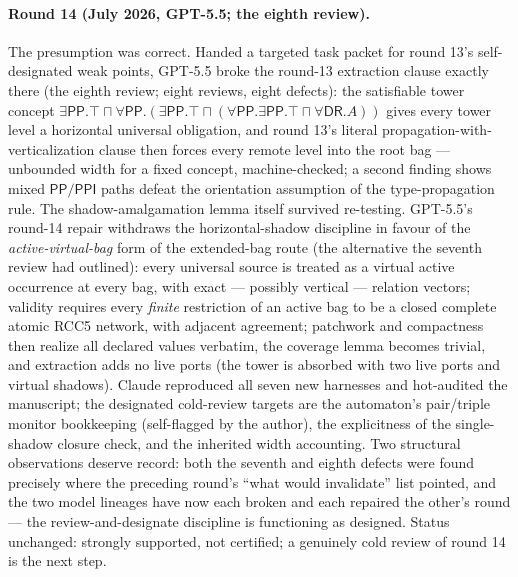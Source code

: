 \documentclass[
]{ceurart}
\theoremstyle{definition}
\newcommand{\DR}{\ensuremath{\mathsf{DR}}}
\newcommand{\PP}{\ensuremath{\mathsf{PP}}}
\newcommand{\PPI}{\ensuremath{\mathsf{PPI}}}
\begin{document}
\paragraph{Round 14 (July 2026, GPT-5.5; the eighth review).}
The presumption was correct.  Handed a targeted task packet for round 13's
self-designated weak points, GPT-5.5 broke the round-13 extraction clause
exactly there (the eighth review; eight reviews, eight defects): the
satisfiable tower concept
$\exists\PP.\top\sqcap\forall\PP.(\exists\PP.\top\sqcap(\forall\PP.\exists\PP.\top
\sqcap\forall\DR.A))$ gives every tower level a horizontal universal
obligation, and round 13's literal propagation-with-verticalization clause
then forces every remote level into the root bag --- unbounded width for a
fixed concept, machine-checked; a second finding shows mixed
$\PP/\PPI$ paths defeat the orientation assumption of the type-propagation
rule.  The shadow-amalgamation lemma itself survived re-testing.  GPT-5.5's
round-14 repair withdraws the horizontal-shadow discipline in favour of the
\emph{active-virtual-bag} form of the extended-bag route (the alternative
the seventh review had outlined): every universal source is treated as a
virtual active occurrence at every bag, with exact --- possibly vertical ---
relation vectors; validity requires every \emph{finite} restriction of an
active bag to be a closed complete atomic RCC5 network, with adjacent
agreement; patchwork and compactness then realize all declared values
verbatim, the coverage lemma becomes trivial, and extraction adds no live
ports (the tower is absorbed with two live ports and virtual shadows).
Claude reproduced all seven new harnesses and hot-audited the manuscript;
the designated cold-review targets are the automaton's pair/triple monitor
bookkeeping (self-flagged by the author), the explicitness of the
single-shadow closure check, and the inherited width accounting.  Two
structural observations deserve record: both the seventh and eighth defects
were found precisely where the preceding round's ``what would invalidate''
list pointed, and the two model lineages have now each broken and each
repaired the other's round --- the review-and-designate discipline is
functioning as designed.  Status unchanged: strongly supported, not
certified; a genuinely cold review of round 14 is the next step.
\end{document}
